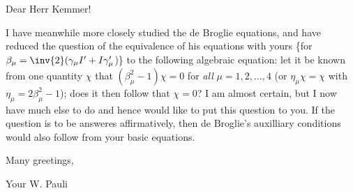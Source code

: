 \date{May 8, 1939}

Dear Herr Kemmer!

I have meanwhile more closely studied the de Broglie equations, and have reduced the question of the equivalence of his equations with yours \{for $\beta_\mu = \inv{2}(\gamma_\mu I' + I\gamma'_\mu$)\} to the following algebraic equation: let it be known from one quantity $\chi$ that $(\beta_\mu^2 - 1)\chi = 0$ for \textit{all} $\mu=1,2,\dots,4$ (or $\eta_\mu\chi = \chi$ with $\eta_\mu = 2\beta_\mu^2 - 1$); does it then follow that $\chi=0$? I am almost certain, but I now have much else to do and hence would like to put this question to you. If the question is to be answeres affirmatively, then de Broglie's auxilliary conditions would also follow from your basic equations.

Many greetings,

Your W. Pauli

